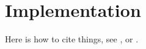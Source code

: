 \section{Implementation}
\label{sec:implementation}
Here is how to cite things, 
see \cite{appengine}, \cite{googlehangouts} or \cite{spotify}.
